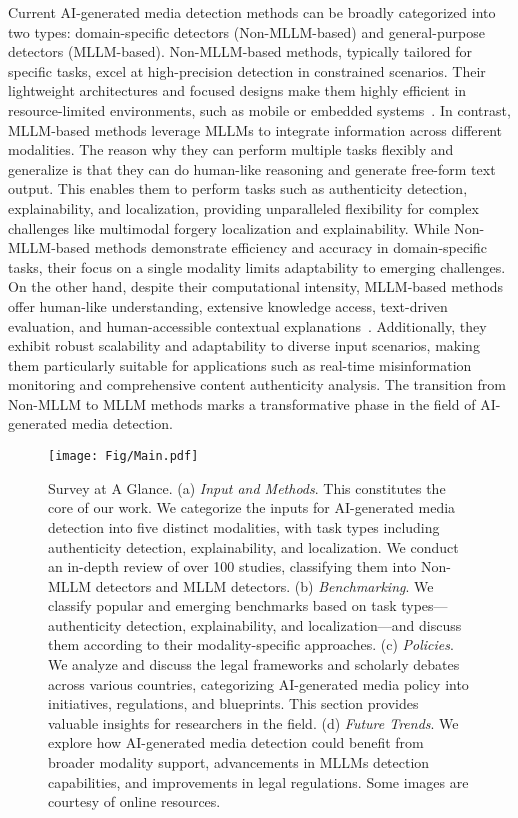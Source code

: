 Current AI-generated media detection methods can be broadly categorized into two types: domain-specific detectors (Non-MLLM-based) and general-purpose detectors (MLLM-based). Non-MLLM-based methods, typically tailored for specific tasks, excel at high-precision detection in constrained scenarios. Their lightweight architectures and focused designs make them highly efficient in resource-limited environments, such as mobile or embedded systems~\cite{epstein2023online, akram2023empirical}. In contrast, MLLM-based methods leverage MLLMs to integrate information across different modalities. The reason why they can perform multiple tasks flexibly and generalize is that they can do human-like reasoning and generate free-form text output. This enables them to perform tasks such as authenticity detection, explainability, and localization, providing unparalleled flexibility for complex challenges like multimodal forgery localization and explainability. While Non-MLLM-based methods demonstrate efficiency and accuracy in domain-specific tasks, their focus on a single modality limits adaptability to emerging challenges. On the other hand, despite their computational intensity, MLLM-based methods offer human-like understanding, extensive knowledge access, text-driven evaluation, and human-accessible contextual explanations~\cite{dang2024explainable}. Additionally, they exhibit robust scalability and adaptability to diverse input scenarios, making them particularly suitable for applications such as real-time misinformation monitoring and comprehensive content authenticity analysis. The transition from Non-MLLM to MLLM methods marks a transformative phase in the field of AI-generated media detection.

\begin{figure*}[!ht]
  \centering
    \texttt{[image: Fig/Main.pdf]} 
    \caption{Survey at A Glance. (a) \textit{Input and Methods}. This constitutes the core of our work. We categorize the inputs for AI-generated media detection into five distinct modalities, with task types including authenticity detection, explainability, and localization. We conduct an in-depth review of over 100 studies, classifying them into Non-MLLM detectors and MLLM detectors. (b) \textit{Benchmarking}. We classify popular and emerging benchmarks based on task types—authenticity detection, explainability, and localization—and discuss them according to their modality-specific approaches. (c) \textit{Policies}. We analyze and discuss the legal frameworks and scholarly debates across various countries, categorizing AI-generated media policy into initiatives, regulations, and blueprints. This section provides valuable insights for researchers in the field. (d) \textit{Future Trends}. We explore how AI-generated media detection could benefit from broader modality support, advancements in MLLMs detection capabilities, and improvements in legal regulations. Some images are courtesy of online resources. 
    }
    \label{fig:main}
\end{figure*}


